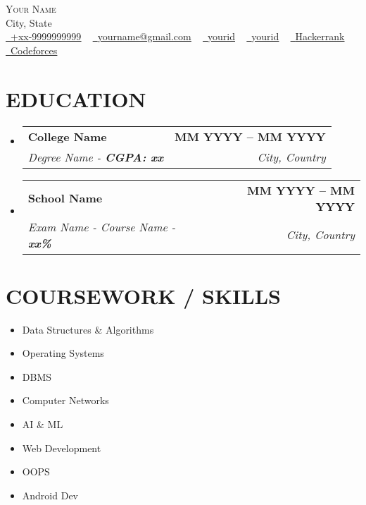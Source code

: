 \documentclass[letterpaper,11pt]{article}
\makeatletter
\newcommand{\resumeSubheading}[4]{
    \vspace{-2pt}\item
    \begin{tabular*}{1.0\textwidth}[t]{l@{\extracolsep{\fill}}r}
        \textbf{\large#1} & \textbf{\small #2} \\
        \textit{\large#3} & \textit{\small #4} \\
    \end{tabular*}\vspace{-7pt}
}
\newcommand{\resumeSubHeadingListStart}{\begin{itemize}[leftmargin=0.0in, label={}]}
\newcommand{\resumeSubHeadingListEnd}{\end{itemize}}
\makeatother
\begin{document}
\begin{center}
{\Huge \scshape Your Name} \\ \vspace{1pt}
City, State \\ \vspace{1pt}
\small
\href{tel:+xx9999999999}{\raisebox{-0.1\height}\faPhone\ \underline{+xx-9999999999}} ~
\href{mailto:yourname@gmail.com}{\raisebox{-0.2\height}\faEnvelope\ \underline{yourname@gmail.com}} ~
\href{https://linkedin.com/in/yourid}{\raisebox{-0.2\height}\faLinkedin\ \underline{yourid}} ~
\href{https://github.com/yourid}{\raisebox{-0.2\height}\faGithub\ \underline{yourid}} ~
\href{https://www.hackerrank.com/yourid}{\raisebox{-0.2\height}\faGlobe\ \underline{Hackerrank}} ~
\href{https://codeforces.com/profile/yourid}{\raisebox{-0.2\height}\faGlobe\ \underline{Codeforces}}
\vspace{-8pt}
\end{center}

\section{EDUCATION}
\resumeSubHeadingListStart
\resumeSubheading
{College Name}{MM YYYY -- MM YYYY}
{Degree Name - \textbf{CGPA: xx}}{City, Country}
\resumeSubHeadingListEnd

\resumeSubHeadingListStart
\resumeSubheading
{School Name}{MM YYYY -- MM YYYY}
{Exam Name - Course Name - \textbf{xx\%}}{City, Country}
\resumeSubHeadingListEnd

\section{COURSEWORK / SKILLS}
\begin{multicols}{4}
\begin{itemize}[itemsep=-2pt]
\item Data Structures \& Algorithms
\item Operating Systems
\item DBMS
\item Computer Networks
\item AI \& ML
\item Web Development
\item OOPS
\item Android Dev
\end{itemize}
\end{multicols}
\end{document}
